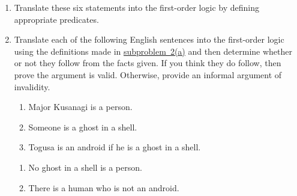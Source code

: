 \begin{enumerate}
        \begin{enumerate}
            \item\label{prob:2a}
                Translate these six statements into the first-order logic by defining appropriate predicates.
            \item
                Translate each of the following English sentences into the first-order logic
                using the definitions made in \hyperref[prob:2a]{subproblem~2(a)}
                and then determine whether or not they follow from the facts given.
                If you think they do follow, then prove the argument is valid.
                Otherwise, provide an informal argument of invalidity.
                \begin{center}
                    \begin{minipage}{0.5\linewidth}
                        \begin{enumerate}
                            \item
                                Major Kusanagi is a person.
                            \item
                                Someone is a ghost in a shell.
                            \item
                                Togusa is an android if he is a ghost in a shell.
                        \end{enumerate}
                    \end{minipage}%
                    \begin{minipage}{0.5\linewidth}
                        \begin{enumerate}
                            \item
                                No ghost in a shell is a person.
                            \item
                                There is a human who is not an android.
                        \end{enumerate}
                    \end{minipage}
                \end{center}
        \end{enumerate}
\end{enumerate}


